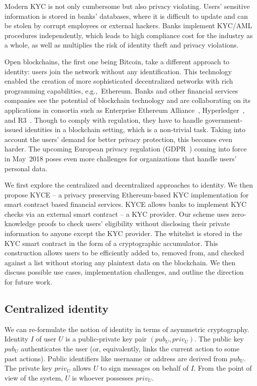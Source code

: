 Modern KYC is not only cumbersome but also privacy violating.
Users' sensitive information is stored in banks' databases, where it is difficult to update and can be stolen by corrupt employees or external hackers.
Banks implement KYC/AML procedures independently, which leads to high compliance cost for the industry as a whole, as well as multiplies the risk of identity theft and privacy violations.

Open blockchains, the first one being Bitcoin, take a different approach to identity: users join the network without any identification.
This technology enabled the creation of more sophisticated decentralized networks with rich programming capabilities, e.g.,~Ethereum.
Banks and other financial services companies see the potential of blockchain technology and are collaborating on its applications in consortia such as Enterprise Ethereum Alliance~\cite{EEA2017}, Hyperledger~\cite{Hyperledger}, and R3~\cite{R3}.
Though to comply with regulation, they have to handle government-issued identities in a blockchain setting, which is a non-trivial task.
Taking into account the users' demand for better privacy protection, this becomes even harder.
The upcoming European privacy regulation (GDPR~\cite{GDPR16}) coming into force in May~2018 poses even more challenges for organizations that handle users' personal data.

We first explore the centralized and decentralized approaches to identity.
We then propose KYCE -- a privacy preserving Ethereum-based KYC implementation for smart contract based financial services.
KYCE allows banks to implement KYC checks via an external smart contract -- a KYC provider.
Our scheme uses zero-knowledge proofs to check users' eligibility without disclosing their private information to anyone except the KYC provider.
The whitelist is stored in the KYC smart contract in the form of a cryptographic accumulator.
This construction allows users to be efficiently added to, removed from, and checked against a list without storing any plaintext data on the blockchain.
We then discuss possible use cases, implementation challenges, and outline the direction for future work.

\subsection{Centralized identity}

We can re-formulate the notion of identity in terms of asymmetric cryptography.
Identity $I$ of user $U$ is a public-private key pair $(pub_U, priv_U)$.
The public key $pub_U$ authenticates the user (or, equivalently, links the current action to some past actions).
Public identifiers like username or address are derived from $pub_U$.
The private key $priv_U$ allows $U$ to sign messages on behalf of $I$.
From the point of view of the system, $U$ is whoever possesses $priv_U$.

